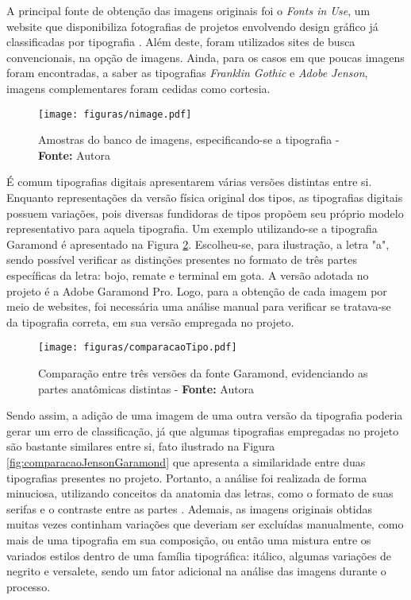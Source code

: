 A principal fonte de obtenção das imagens originais foi o \textit{Fonts in Use}, um website que disponibiliza fotografias de projetos envolvendo design gráfico já classificadas por tipografia . Além deste, foram utilizados sites de busca convencionais, na opção de imagens. Ainda, para os casos em que poucas imagens foram encontradas, a saber as tipografias \textit{Franklin Gothic} e \textit{Adobe Jenson}, imagens complementares foram cedidas como cortesia.


\begin{figure}[H]
  \centering
  \texttt{[image: figuras/nimage.pdf]}
  \caption{Amostras do banco de imagens, especificando-se a tipografia - \textbf{Fonte:} Autora}
  \label{fig:nimage}
\end{figure}


É comum tipografias digitais apresentarem várias versões distintas entre si. Enquanto representações da versão física original dos tipos, as tipografias digitais possuem variações, pois diversas fundidoras de tipos propõem seu próprio modelo representativo para aquela tipografia. Um exemplo utilizando-se a tipografia Garamond é apresentado na Figura \ref{fig:comparacaoTipos}. Escolheu-se, para ilustração, a letra "a", sendo possível verificar as distinções presentes no formato de três partes específicas da letra: bojo, remate e terminal em gota. A versão adotada no projeto é a Adobe Garamond Pro. Logo, para a obtenção de cada imagem por meio de websites, foi necessária uma análise manual para verificar se tratava-se da tipografia correta, em sua versão empregada no projeto.


\begin{figure}[H]
  \centering
  \texttt{[image: figuras/comparacaoTipo.pdf]}
  \caption{Comparação entre três versões da fonte Garamond, evidenciando as partes anatômicas distintas - \textbf{Fonte:} Autora}
  \label{fig:comparacaoTipos}
\end{figure}

Sendo assim, a adição de uma imagem de uma outra versão da tipografia poderia gerar um erro de classificação, já que algumas tipografias empregadas no projeto são bastante similares entre si, fato ilustrado na Figura \ref{fig:comparacaoJensonGaramond} que apresenta a similaridade entre duas tipografias presentes no projeto. Portanto, a análise foi realizada de forma minuciosa, utilizando conceitos da anatomia das letras, como o formato de suas serifas e o contraste entre as partes . Ademais, as imagens originais obtidas muitas vezes continham variações que deveriam ser excluídas manualmente, como mais de uma tipografia em sua composição, ou então uma mistura entre os variados estilos dentro de uma família tipográfica: itálico, algumas variações de negrito e versalete, sendo um fator adicional na análise das imagens durante o processo.

